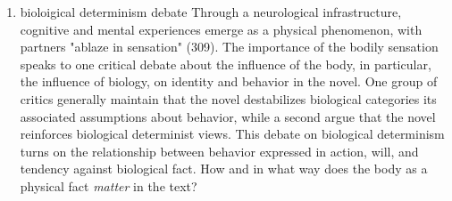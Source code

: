 \documentclass[11pt]{article}
\begin{document}
\begin{enumerate}
\item bioloigical determinism debate
\label{sec:org59532c0}
Through a neurological infrastructure, cognitive and mental
experiences emerge as a physical phenomenon, with partners "ablaze in
sensation" (309). The importance of the bodily sensation speaks to one
critical debate about the influence of the body, in particular, the
influence of biology, on identity and behavior in the novel. One group
of critics generally maintain that the novel destabilizes biological
categories its associated assumptions about behavior, while a second
argue that the novel reinforces biological determinist views. This
debate on biological determinism turns on the relationship between
behavior expressed in action, will, and tendency against biological
fact. How and in what way does the body as a physical fact \emph{matter} in
the text?


\end{enumerate}
\end{document}
